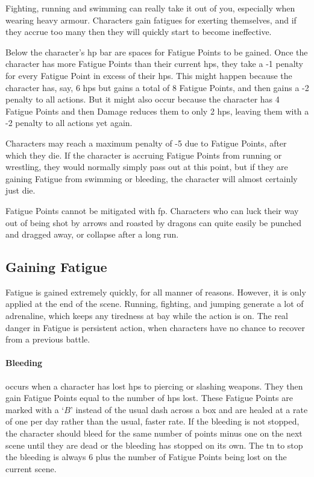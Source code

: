 \begin{multicols}{2}

\label{fatigue}
\noindent
Fighting, running and swimming can really take it out of you, especially when wearing heavy armour.
Characters gain \glspl{fatigue} for exerting themselves, and if they accrue too many then they will quickly start to become ineffective.

Below the character's \gls{hp} bar are spaces for Fatigue Points to be gained.
Once the character has more Fatigue Points than their current \glspl{hp}, they take a -1 penalty for every Fatigue Point in excess of their \glspl{hp}.
 This might happen because the character has, say, 6 \glspl{hp} but gains a total of 8 Fatigue Points, and then gains a -2 penalty to all actions.
But it might also occur because the character has 4 Fatigue Points and then Damage reduces them to only 2 \glspl{hp}, leaving them with a -2 penalty to all actions yet again.

Characters may reach a maximum penalty of -5 due to Fatigue Points, after which they die. If the character is accruing Fatigue Points from running or wrestling, they would normally simply pass out at this point, but if they are gaining Fatigue from swimming or bleeding, the character will almost certainly just die.

Fatigue Points cannot be mitigated with \gls{fp}. Characters who can luck their way out of being shot by arrows and roasted by dragons can quite easily be punched and dragged away, or collapse after a long run.

\subsection{Gaining Fatigue}

Fatigue is gained extremely quickly, for all manner of reasons.
However, it is only applied at the end of the scene.
Running, fighting, and jumping generate a lot of adrenaline, which keeps any tiredness at bay while the action is on.
The real danger in Fatigue is persistent action, when characters have no chance to recover from a previous battle.

\fatiguechart

\paragraph{Bleeding} occurs when a character has lost \glspl{hp} to piercing or slashing weapons.
They then gain Fatigue Points equal to the number of \glspl{hp} lost.
These Fatigue Points are marked with a `$B$' instead of the usual dash across a box and are healed at a rate of one per day rather than the usual, faster rate.
If the bleeding is not stopped, the character should bleed for the same number of points minus one on the next scene until they are dead or the bleeding has stopped on its own.
The \gls{tn} to stop the bleeding is always 6 plus the number of Fatigue Points being lost on the current scene.


\end{multicols}
